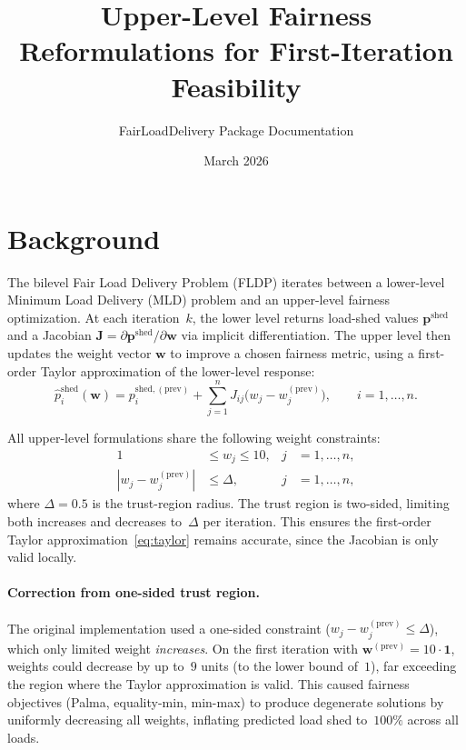\documentclass[11pt]{article}
\title{Upper-Level Fairness Reformulations for First-Iteration Feasibility}
\author{FairLoadDelivery Package Documentation}
\date{March 2026}
\begin{document}
\maketitle

\section{Background}

The bilevel Fair Load Delivery Problem (FLDP) iterates between a lower-level Minimum Load Delivery (MLD) problem and an upper-level fairness optimization.
At each iteration~$k$, the lower level returns load-shed values $\mathbf{p}^{\mathrm{shed}}$ and a Jacobian $\mathbf{J} = \partial \mathbf{p}^{\mathrm{shed}} / \partial \mathbf{w}$ via implicit differentiation.
The upper level then updates the weight vector $\mathbf{w}$ to improve a chosen fairness metric, using a first-order Taylor approximation of the lower-level response:
\begin{equation}\label{eq:taylor}
    \hat{p}_i^{\mathrm{shed}}(\mathbf{w})
    = p_i^{\mathrm{shed,(prev)}}
      + \sum_{j=1}^{n} J_{ij} \bigl(w_j - w_j^{\mathrm{(prev)}}\bigr),
    \qquad i = 1,\dots,n.
\end{equation}

All upper-level formulations share the following weight constraints:
\begin{align}
    1 &\le w_j \le 10, & j &= 1,\dots,n, \label{eq:wbounds}\\
    |w_j - w_j^{\mathrm{(prev)}}| &\le \Delta, & j &= 1,\dots,n, \label{eq:trust}
\end{align}
where $\Delta = 0.5$ is the trust-region radius.
The trust region is two-sided, limiting both increases and decreases to~$\Delta$ per iteration.
This ensures the first-order Taylor approximation~\eqref{eq:taylor} remains accurate, since the Jacobian is only valid locally.

\paragraph{Correction from one-sided trust region.}
The original implementation used a one-sided constraint ($w_j - w_j^{\mathrm{(prev)}} \le \Delta$), which only limited weight \emph{increases}.
On the first iteration with $\mathbf{w}^{\mathrm{(prev)}} = 10 \cdot \mathbf{1}$, weights could decrease by up to~$9$ units (to the lower bound of~$1$), far exceeding the region where the Taylor approximation is valid.
This caused fairness objectives (Palma, equality-min, min-max) to produce degenerate solutions by uniformly decreasing all weights, inflating predicted load shed to~$100\%$ across all loads.
\end{document}
